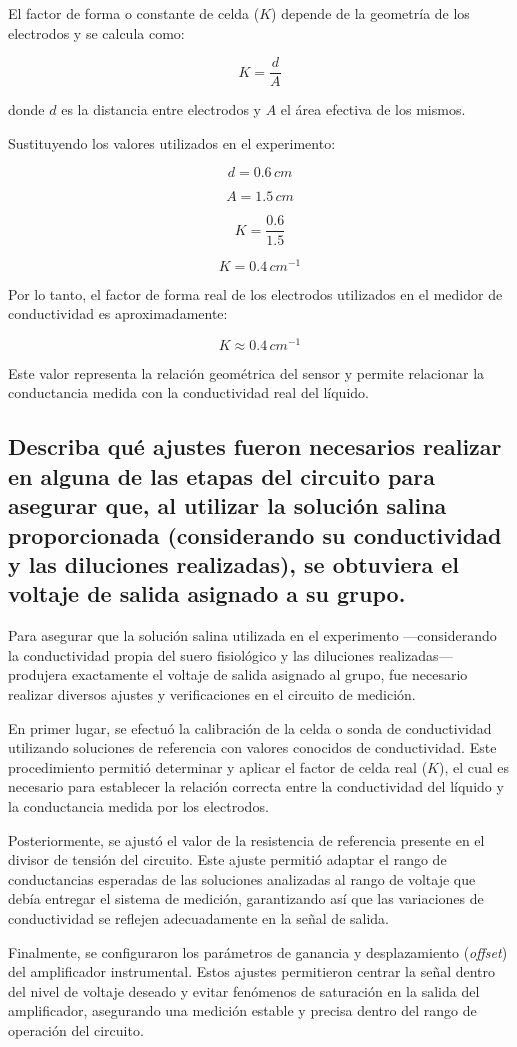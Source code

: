\documentclass[a4paper,openany,12pt]{book}
\begin{document}
El factor de forma o constante de celda (\(K\)) depende de la geometría
de los electrodos y se calcula como:

\[
K = \frac{d}{A}
\]

donde \(d\) es la distancia entre electrodos y \(A\) el área efectiva de
los mismos.

Sustituyendo los valores utilizados en el experimento:

\[
d = 0.6\,cm
\]

\[
A = 1.5\,cm
\]

\[
K = \frac{0.6}{1.5}
\]

\[
K = 0.4 \, cm^{-1}
\]

Por lo tanto, el factor de forma real de los electrodos utilizados en el
medidor de conductividad es aproximadamente:

\[
K \approx 0.4 \, cm^{-1}
\]

Este valor representa la relación geométrica del sensor y permite
relacionar la conductancia medida con la conductividad real del
líquido.

\subsection {Describa qué ajustes fueron necesarios realizar en alguna de las etapas del circuito para asegurar que, al utilizar la solución salina proporcionada (considerando su conductividad y las diluciones realizadas), se obtuviera el voltaje de salida asignado a su grupo.}
Para asegurar que la solución salina utilizada en el experimento —considerando la
conductividad propia del suero fisiológico y las diluciones realizadas— produjera
exactamente el voltaje de salida asignado al grupo, fue necesario realizar diversos
ajustes y verificaciones en el circuito de medición.

En primer lugar, se efectuó la calibración de la celda o sonda de conductividad
utilizando soluciones de referencia con valores conocidos de conductividad. Este
procedimiento permitió determinar y aplicar el factor de celda real ($K$), el cual es
necesario para establecer la relación correcta entre la conductividad del líquido y la
conductancia medida por los electrodos.

Posteriormente, se ajustó el valor de la resistencia de referencia presente en el
divisor de tensión del circuito. Este ajuste permitió adaptar el rango de conductancias
esperadas de las soluciones analizadas al rango de voltaje que debía entregar el
sistema de medición, garantizando así que las variaciones de conductividad se
reflejen adecuadamente en la señal de salida.

Finalmente, se configuraron los parámetros de ganancia y desplazamiento
(\textit{offset}) del amplificador instrumental. Estos ajustes permitieron centrar la
señal dentro del nivel de voltaje deseado y evitar fenómenos de saturación en la
salida del amplificador, asegurando una medición estable y precisa dentro del rango
de operación del circuito.




\end{document}
